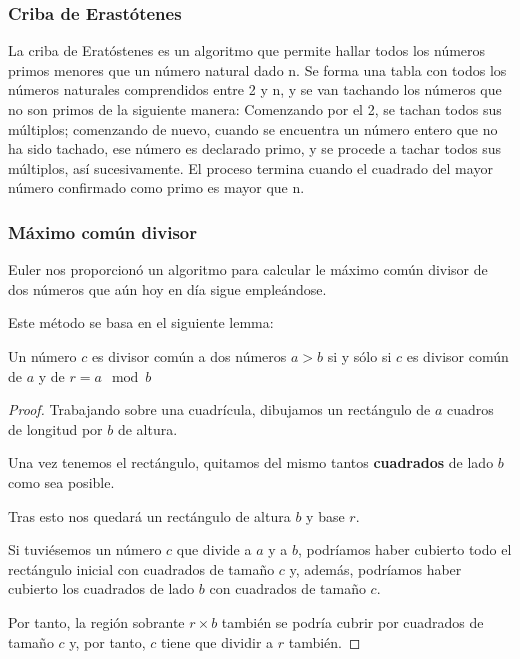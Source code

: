 \documentclass{apuntes}
\begin{document}
\subsubsection{Criba de Erastótenes}
\begin{defn}
La criba de Eratóstenes es un algoritmo que permite hallar todos los números primos menores que un número natural dado n. Se forma una tabla con todos los números naturales comprendidos entre 2 y n, y se van tachando los números que no son primos de la siguiente manera: Comenzando por el 2, se tachan todos sus múltiplos; comenzando de nuevo, cuando se encuentra un número entero que no ha sido tachado, ese número es declarado primo, y se procede a tachar todos sus múltiplos, así sucesivamente. El proceso termina cuando el cuadrado del mayor número confirmado como primo es mayor que n.
\end{defn}

\subsubsection{Máximo común divisor}
Euler nos proporcionó un algoritmo para calcular le máximo común divisor de dos números que aún hoy en día sigue empleándose.

Este método se basa en el siguiente lemma:
\begin{lemma}
Un número $c$ es divisor común a dos números $a>b$ si y sólo si $c$ es divisor común de $a$ y de $r=a\mod b$ 
\end{lemma}
\begin{proof}
Trabajando sobre una cuadrícula, dibujamos un rectángulo de $a$ cuadros de longitud por $b$ de altura.

Una vez tenemos el rectángulo, quitamos del mismo tantos \textbf{cuadrados} de lado $b$ como sea posible. 

Tras esto nos quedará un rectángulo de altura $b$ y base $r$.

\begin{center}
\end{center}

Si tuviésemos un número $c$ que divide a $a$ y a $b$, podríamos haber cubierto todo el rectángulo inicial con cuadrados de tamaño $c$ y, además, podríamos haber cubierto los cuadrados de lado $b$ con cuadrados de tamaño $c$. 

Por tanto, la región sobrante $r\times b$ también se podría cubrir por cuadrados de tamaño $c$ y, por tanto, $c$ tiene que dividir a $r$ también.
\end{proof}
\end{document}
